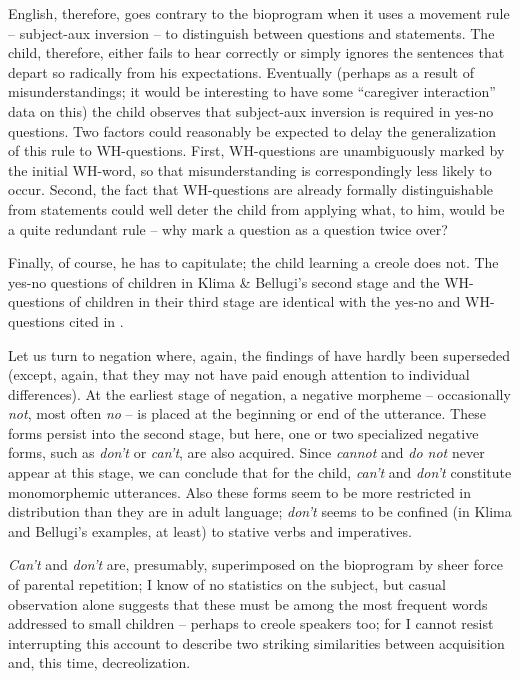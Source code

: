 English, therefore, goes contrary to the bioprogram when it uses a movement rule -- subject-aux inversion -- to distinguish between questions and statements. The child, therefore, either fails to hear correctly or simply ignores the sentences that depart so radically from his expectations. Eventually (perhaps as a result of misunderstandings; it would be interesting to have some ``caregiver interaction'' data on this) the child observes that subject-aux inversion is required in yes-no questions. Two factors could reasonably be expected to delay the generalization of this rule to WH-questions. First, WH-questions are unambiguously marked by the initial WH-word, so that misunderstanding is correspondingly less likely to occur. Second, the fact that WH-questions are already formally distinguishable from statements could well deter the child from applying what, to him, would be a quite redundant rule -- why mark a question as a question twice over?

Finally, of course, he has to capitulate; the child learning a creole does not. The yes-no questions of children in Klima \& Bellugi's
second stage and the WH-questions of children in their third stage are identical with the yes-no and WH-questions cited in .

Let us turn to negation where, again, the findings of \citet{KlimaEtAl1966} have hardly been superseded (except, again, that they may not have paid enough attention to individual differences). At the earliest stage of negation, a negative morpheme -- occasionally \textit{not}, most often \textit{no} -- is placed at the beginning or end of the utterance. These forms persist into the second stage, but here, one or two specialized negative forms, such as \textit{don't} or \textit{can't}, are also acquired. Since \textit{cannot} and \textit{do not} never appear at this stage, we can conclude that for the child, \textit{can't} and \textit{don't} constitute monomorphemic utterances. Also these forms seem to be more restricted in distribution than they are in adult language; \textit{don't} seems to be confined (in Klima and Bellugi's examples, at least) to stative verbs and imperatives.

\textit{Can't} and \textit{don't} are, presumably, superimposed on the bioprogram by sheer force of parental repetition; I know of no statistics on the subject, but casual observation alone suggests that these must be among the most frequent words addressed to small children -- perhaps to creole speakers too; for I cannot resist interrupting this account to describe two striking similarities between acquisition and, this time, decreolization.\\\\

